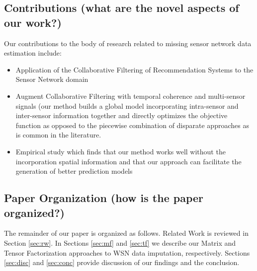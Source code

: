 \subsection{Contributions (what are the novel aspects of our work?)}
Our contributions to the body of research related to missing sensor network data estimation include:
\begin{itemize}
\item Application of the Collaborative Filtering of Recommendation Systems to the Sensor Network domain
\item Augment Collaborative Filtering with temporal coherence and multi-sensor signals (our method builds a global model incorporating intra-sensor and inter-sensor information together and directly optimizes the objective function as opposed to the piecewise combination of disparate approaches as is common in the literature.
\item Empirical study which finds that our method works well without the incorporation spatial information and that our approach can facilitate the generation of better prediction models
\end{itemize}

\subsection{Paper Organization (how is the paper organized?)}
The remainder of our paper is organized as follows.
Related Work is reviewed in Section \ref{sec:rw}.
In Sections \ref{sec:mf} and \ref{sec:tf} we describe our Matrix and Tensor Factorization approaches to WSN data imputation, respectively.
Sections \ref{sec:disc} and \ref{sec:conc} provide discussion of our findings and the conclusion.
